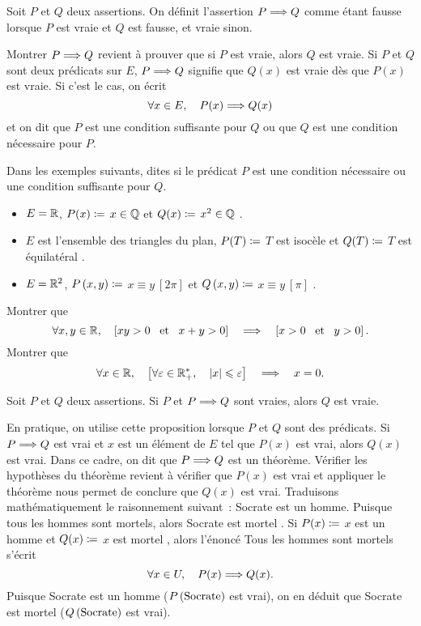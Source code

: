 \documentclass{magnolia}
\begin{document}
\begin{definition}[utile=-3]
Soit $P$ et $Q$ deux assertions. On définit l'assertion $P\Longrightarrow Q$ comme
étant fausse lorsque $P$ est vraie et $Q$ est fausse, et vraie sinon.
\end{definition}

\begin{remarques}
\remarque Montrer $P\Longrightarrow Q$ revient à prouver que si $P$ est
  vraie, alors $Q$ est vraie.
\remarque Si $P$ et $Q$ sont deux prédicats sur $E$, $P\Longrightarrow Q$
  signifie que $Q(x)$ est vraie dès que $P(x)$ est vraie.
  Si c'est le cas, on écrit
  \[\forall x\in E ,\quad P(x) \Longrightarrow Q(x)\]
  et on dit que $P$ est une condition suffisante pour $Q$ ou que $Q$ est une
  condition nécessaire pour $P$.
\end{remarques}

\begin{exos}
\exo Dans les exemples suivants, dites si le prédicat $P$ est une
  condition nécessaire ou une condition suffisante pour $Q$.
  \begin{itemize}
  \item $E=\mathbb{R}$, $P(x)\coloneqq$ \og $x\in\mathbb{Q}$ \fg et $Q(x)\coloneqq$ \og $x^2\in\mathbb{Q}$ \fg. 
  \item $E$ est l'ensemble des triangles du plan, $P(T)\coloneqq$ \og
    $T$ est isocèle \fg et $Q(T)\coloneqq$ \og $T$ est équilatéral \fg.
  \item $E=\mathbb{R}^2$, $P\left(x,y\right)\coloneqq$ \og $x\equiv y\ [2\pi]$ \fg et $Q\left(x,y\right)\coloneqq$
    \og $x\equiv y\ [\pi]$ \fg.
  \end{itemize}
\exo Montrer que
  \[\forall x,y\in\mathbb{R} ,\quad\left[xy>0 \quad\!\text{et}\quad\! x+y>0\right]\quad\Longrightarrow\quad
    \left[x>0 \quad\!\text{et}\quad\! y>0\right].\]
\exo Montrer que
  \[\forall x\in\mathbb{R} ,\quad
    \left[\forall \varepsilon\in\mathbb{R}_+^* ,\quad\left|x\right|\leqslant\varepsilon\right] \quad\Longrightarrow\quad
    x=0.\]
\end{exos}

\begin{proposition}[utile=-3, nom={Modus Ponens}]
Soit $P$ et $Q$ deux assertions. Si $P$ et $P\Longrightarrow Q$ sont vraies, alors
$Q$ est vraie.   
\end{proposition}

\begin{remarqueUnique}
\remarque En pratique, on utilise cette proposition lorsque $P$ et $Q$ sont des
  prédicats. Si $P\Longrightarrow Q$ est vrai et $x$ est un élément de $E$ tel que
  $P(x)$ est vrai, alors $Q(x)$ est vrai. Dans ce cadre, on dit que
  $P\Longrightarrow Q$ est un théorème. Vérifier les hypothèses
  du théorème revient à vérifier que $P(x)$ est vrai et appliquer le
  théorème nous permet de conclure que $Q(x)$ est vrai.
  Traduisons mathématiquement le raisonnement suivant~: \og Socrate
  est un homme. Puisque tous les hommes sont mortels, alors Socrate est
  mortel \fg. Si $P(x)\coloneqq$ \og $x$ est un homme \fg et $Q(x)\coloneqq$ \og $x$ est
  mortel \fg, alors l'énoncé \og Tous les hommes sont mortels \fg s'écrit
  \[\forall x\in U ,\quad P(x) \Longrightarrow Q(x).\]
  Puisque Socrate est un homme ($P\left(\text{Socrate}\right)$ est vrai), on en déduit
  que Socrate est mortel ($Q\left(\text{Socrate}\right)$ est vrai).
\end{remarqueUnique}
\end{document}
